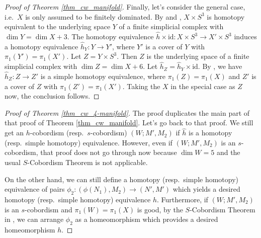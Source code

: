 \documentclass[12pt]{amsart}
\theoremstyle{plain}
\theoremstyle{definition}
\theoremstyle{question}
\theoremstyle{remark}
\theoremstyle{assumption}
\numberwithin{equation}{section}
\theoremstyle{bigthm}
\begin{document}
\begin{proof}[Proof of Theorem \ref{thm_cw_manifold}]
Finally, let's consider the general case, i.e.~$X$ is only assumed to be finitely dominated. By \cite[Theorem 0.1]{Gersten} and \cite[Theorem~13]{Whitehead}, $X \times S^{3}$ is homotopy equivalent to the underlying space $Y$ of a finite simplicial complex  with $\dim Y = \dim X +3$. The homotopy equivalence $\hat{h} \times \mathrm{id} \colon  X \times S^{3} \rightarrow X' \times S^{3}$ induces a homotopy equivalence $\hat{h}_{Y} \colon  Y \rightarrow Y'$, where $Y'$ is a cover of $Y$ with $\pi_{1} (Y') = \pi_{1} (X')$. Let $Z = Y \times S^{3}$. Then $Z$ is the underlying space of a finite simplicial complex with $\dim Z = \dim X +6$. Let $\hat{h}_{Z} = \hat{h}_{Y} \times \mathrm{id}$. By \cite[(23.2)]{Cohen}, we have $\hat{h}_{Z} \colon  Z \rightarrow Z'$ is a simple homotopy equivalence, where $\pi_{1} (Z) = \pi_{1} (X)$ and $Z'$ is a cover of $Z$ with $\pi_{1} (Z') = \pi_{1} (X')$. Taking the $X$ in the special case as $Z$ now, the conclusion follows.
\end{proof}

\begin{proof}[Proof of Theorem \ref{thm_cw_4-manifold}]
The proof duplicates the main part of that proof of Theorem \ref{thm_cw_manifold}. Let's go back to that proof. We still get an $h$-cobordism (resp.~$s$-cobordism) $(W; M', M_{2})$ if $\hat{h}$ is a homotopy (resp.~simple homotopy) equivalence. However, even if $(W; M', M_{2})$ is an $s$-cobordism, that proof does not go through now because $\dim W =5$ and the usual $S$-Cobordism Theorem is not applicable.

On the other hand, we can still define a homotopy (resp.~simple homotopy) equivalence of pairs  $\phi_{2} \colon  (\phi (N_{1}), M_{2}) \rightarrow (N',M')$ which yields a desired homotopy (resp.~simple homotopy) equivalence $h$. Furthermore, if  $(W; M', M_{2})$ is an $s$-cobordism and $\pi_{1} (W) = \pi_{1} (X)$ is good, by the $S$-Cobordism Theorem in \cite[p.~511]{Freedman_Teichner}, we can arrange $\phi_{2}$ as a homeomorphism which provides a desired homeomorphism $h$.
\end{proof}
\end{document}
